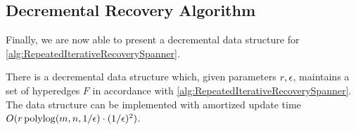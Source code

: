 \documentclass{article}
\begin{document}
\subsection{Decremental Recovery Algorithm}

Finally, we are now able to present a decremental data structure for \cref{alg:RepeatedIterativeRecoverySpanner}. 

\begin{claim}\label{clm:decrementalRIRSpanner}
    There is a decremental data structure which, given parameters $r, \epsilon$, maintains a set of hyperedges $F$ in accordance with \cref{alg:RepeatedIterativeRecoverySpanner}. The data structure can be implemented with amortized update time $O(r\operatorname{polylog}(m,n, 1/\epsilon) \cdot (1 / \epsilon)^2)$.
\end{claim}
\end{document}
